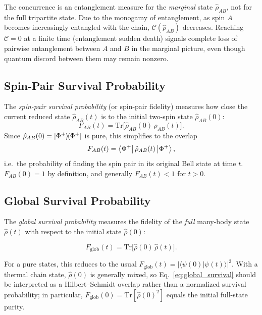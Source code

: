 \documentclass[12pt,a4paper]{article}
\newcommand{\rhohat}{\hat{\rho}}
\renewcommand{\Tr}{\mathrm{Tr}}
\begin{document}
The concurrence is an entanglement measure for the \emph{marginal} state
$\rhohat_{AB}$, not for the full tripartite state.  Due to the monogamy of
entanglement, as spin $A$ becomes increasingly entangled with the chain,
$\mathcal{C}(\rhohat_{AB})$ decreases.  Reaching $\mathcal{C}=0$ at a finite
time (entanglement sudden death) signals complete loss of pairwise entanglement
between $A$ and $B$ in the marginal picture, even though quantum discord between
them may remain nonzero.

\subsection{Spin-Pair Survival Probability}
\label{subsec:survival}

The \emph{spin-pair survival probability} (or spin-pair fidelity) measures how
close the current reduced state $\rhohat_{AB}(t)$ is to the initial two-spin
state $\rhohat_{AB}(0)$:
\begin{equation}
  F_{AB}(t) = \Tr\!\bigl[\rhohat_{AB}(0)\,\rhohat_{AB}(t)\bigr].
  \label{eq:spin_survival}
\end{equation}
Since $\rhohat_{AB}(0)=\ketbra{\Phi^+}{\Phi^+}$ is pure, this simplifies to the
overlap
\begin{equation}
  F_{AB}(t) = \bra{\Phi^+}\rhohat_{AB}(t)\ket{\Phi^+},
  \label{eq:spin_survival_pure}
\end{equation}
i.e.\ the probability of finding the spin pair in its original Bell state at
time $t$.  $F_{AB}(0)=1$ by definition, and generally $F_{AB}(t) < 1$ for
$t > 0$.

\subsection{Global Survival Probability}
\label{subsec:global}

The \emph{global survival probability} measures the fidelity of the \emph{full}
many-body state $\rhohat(t)$ with respect to the initial state $\rhohat(0)$:

\begin{equation}
  F_{\mathrm{glob}}(t) = \Tr\!\bigl[\rhohat(0)\,\rhohat(t)\bigr].
  \label{eq:global_survival}
\end{equation}

For a pure states, this reduces to the usual
$F_{\mathrm{glob}}(t)=|\langle\psi(0)|\psi(t)\rangle|^2$.  With a thermal chain state,
$\rhohat(0)$ is generally mixed, so Eq.~\eqref{eq:global_survival} should be
interpreted as a Hilbert--Schmidt overlap rather than a normalized survival
probability; in particular, $F_{\mathrm{glob}}(0)=\Tr[\rhohat(0)^2]$ equals the
initial full-state purity.
\end{document}
